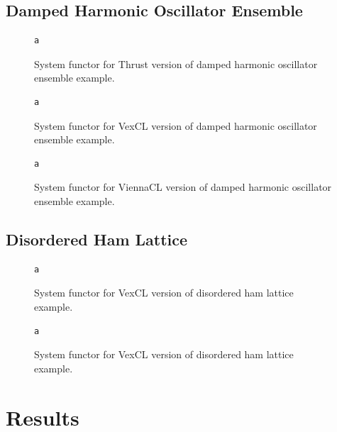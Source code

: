\documentclass[1p]{elsarticle}
\begin{document}
\clearpage

\subsection{Damped Harmonic Oscillator Ensemble}

\begin{figure}
\begin{lstlisting}
a
\end{lstlisting}
\caption{System functor for Thrust version of damped harmonic oscillator
ensemble example.}
\label{code:thrust:damped}
\end{figure}

\begin{figure}
\begin{lstlisting}
a
\end{lstlisting}
\caption{System functor for VexCL version of damped harmonic oscillator
ensemble example.}
\label{code:vexcl:damped}
\end{figure}

\begin{figure}
\begin{lstlisting}
a
\end{lstlisting}
\caption{System functor for ViennaCL version of damped harmonic oscillator
ensemble example.}
\label{code:viennacl:damped}
\end{figure}

\subsection{Disordered Ham Lattice}

\begin{figure}
\begin{lstlisting}
a
\end{lstlisting}
\caption{System functor for VexCL version of disordered ham lattice example.}
\label{code:vexcl:disordered}
\end{figure}

\begin{figure}
\begin{lstlisting}
a
\end{lstlisting}
\caption{System functor for VexCL version of disordered ham lattice example.}
\label{code:viennacl:disordered}
\end{figure}

\section{Results}
\end{document}
